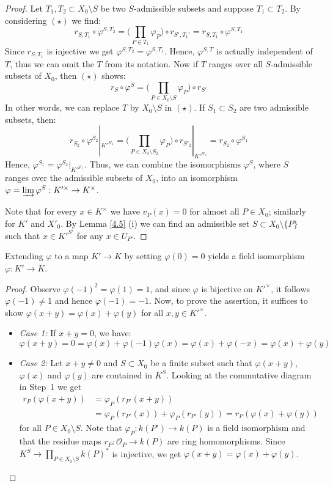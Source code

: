 \begin{proof}
Let $T_1, T_2\subset X_0\setminus S$ be two $S$-admissible subsets and suppose $T_1\subset T_2$. By considering $(\star)$ we find:
\[ r_{S,T_1}\circ\varphi^{S,T_2}=\Big(\prod_{P\in T_1}\varphi_P\Big)\circ r_{S',T_1'} = r_{S,T_1}\circ\varphi^{S,T_1} \]
Since $r_{S,T_1}$ is injective we get $\varphi^{S,T_2}=\varphi^{S,T_1}$. Hence, $\varphi^{S,T}$ is actually independent of $T$, thus we can omit the $T$ from its notation. Now if $T$ ranges over all $S$-admissible subsets of $X_0$, then $(\star)$ shows:
\[ r_S\circ\varphi^S = \Big(\prod_{P\in X_0\setminus S}\varphi_P \Big)\circ r_{S'} \]
In other words, we can replace $T$ by $X_0\setminus S$ in $(\star)$. If $S_1\subset S_2$ are two admissible subsets, then:
\[ r_{S_2}\circ\varphi^{S_2}|_{K'^{S'_1}} = \Big(\prod_{P\in X_0\setminus S_2}\varphi_P \Big)\circ r_{S'_2}|_{K'^{S'_1}} = r_{S_2}\circ\varphi^{S_1} \]
Hence, $\varphi^{S_1}=\varphi^{S_2}|_{K'^{S'_1}}$. Thus, we can combine the isomorphisms $\varphi^S$, where $S$ ranges over the admissible subsets of $X_0$, into an isomorphism $\varphi = \varinjlim \varphi^S: K'^\times \to K^\times$. 

Note that for every $x\in K^\times$ we have $v_P(x)= 0$ for almost all $P\in X_0$; similarly for $K'$ and $X'_0$. By Lemma \ref{4.5} (i) we can find an admissible set $S\subset X_0\setminus \{P\}$ such that $x\in K'^{S'}$ for any $x\in U_{P'}$.
\end{proof}

\begin{step}
Extending $\varphi$ to a map $K'\to K$ by setting $\varphi(0)=0$ yields a field isomorphism $\varphi:K'\to K$.
\end{step}

\begin{proof}
Observe $\varphi(-1)^2 = \varphi(1) = 1$, and since $\varphi$ is bijective on $K'^\times$, it follows $\varphi(-1) \neq 1$ and hence $\varphi(-1) = -1$. Now, to prove the assertion, it suffices to show $\varphi(x + y) = \varphi(x) + \varphi(y)$ for all $x,y\in K'^\times$.
\begin{itemize}
\item \textit{Case 1:} If $x + y = 0$, we have:
\[ \varphi(x + y) = 0 = \varphi(x) + \varphi(-1)\varphi(x) = \varphi(x) + \varphi(-x) = \varphi(x) + \varphi(y) \]
\item \textit{Case 2:} Let $x + y\neq 0$ and $S\subset X_0$ be a finite subset such that $\varphi(x + y)$, $\varphi(x)$ and $\varphi(y)$ are contained in $K^S$. Looking at the commutative diagram in \mbox{Step 1} we get
\begin{align*}
r_P(\varphi(x+ y)) &= \varphi_P(r_{P'}(x + y)) \\
&= \varphi_P(r_{P'}(x)) + \varphi_P(r_{P'}(y)) = r_P(\varphi(x) + \varphi(y))
\end{align*}
for all $P\in X_0\setminus S$. Note that $\varphi_P: k(P')\to k(P)$ is a field isomorphism and that the residue maps $r_{P}: \mathcal{O}_{P} \to k(P)$ are ring homomorphisms. Since $K^S\to \prod_{P\in X_0\setminus S} k(P)^\ast$ is injective, we get $\varphi(x+y) = \varphi(x) + \varphi(y)$.\qedhere
\end{itemize}
\end{proof}

